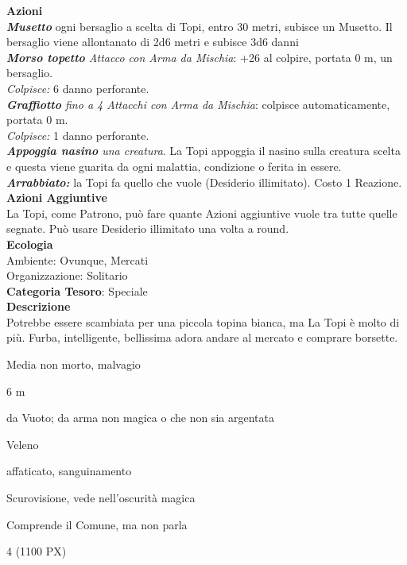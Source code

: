 \begin{multicols}{2}
{\textbf{Azioni}\\
\emph{\textbf{Musetto}} ogni bersaglio a scelta di Topi, entro 30 metri, subisce un Musetto. Il bersaglio viene allontanato di 2d6 metri e subisce 3d6 danni\\
\emph{\textbf{Morso topetto} Attacco con Arma da Mischia}: +26 al colpire, portata 0 m, un bersaglio.\\
\emph{Colpisce:} 6 danno perforante.\\
\emph{\textbf{Graffiotto} fino a 4 Attacchi con Arma da Mischia}: colpisce  automaticamente, portata 0 m.\\
\emph{Colpisce:} 1 danno perforante.\\
\emph{\textbf{Appoggia nasino} una creatura}. La Topi appoggia il nasino sulla creatura scelta e questa viene guarita da ogni malattia, condizione o ferita in essere.\\
\emph{\textbf{Arrabbiato:}} la Topi fa quello che vuole (Desiderio illimitato). Costo 1 Reazione.\\
\textbf{Azioni Aggiuntive}\\
La Topi, come Patrono, può fare quante Azioni aggiuntive vuole tra tutte quelle segnate. Può usare Desiderio illimitato una volta a round.\\
\textbf{Ecologia}\\
Ambiente: Ovunque, Mercati\\
Organizzazione: Solitario\\
\textbf{Categoria Tesoro}: Speciale\\
\textbf{Descrizione}\\
Potrebbe essere scambiata per una piccola topina bianca, ma La Topi è molto di più. Furba, intelligente, bellissima adora andare al mercato e comprare borsette.


\begin{description}[noitemsep, topsep=0pt, parsep=0pt, partopsep=0pt, itemsep=1pt, leftmargin=2.35cm,  labelwidth=2.2cm, itemindent=0cm, listparindent=0pt] %
\setlength{\baselineskip}{10pt}
\item[\textbf{Taglia/Tipo}] Media non morto, malvagio
\item[\textbf{Caratt.}] 
\item[\textbf{Punti Ferita}] 
\item[\textbf{Movimento}] 6 m
\item[\textbf{Tiri Salvez.}] 
\item[\textbf{Res. Danni}] da Vuoto; da arma non magica o che non sia argentata
\item[\textbf{Imm. Danni}] Veleno
\item[\textbf{Immunità}] affaticato, sanguinamento
\item[\textbf{Sensi}] Scurovisione, vede nell'oscurità magica
\item[\textbf{Linguaggi}] Comprende il Comune, ma non parla
\item[\textbf{Sfida}] 4 (1100 PX)
\end{description}
\smallskip

}
\end{multicols}
